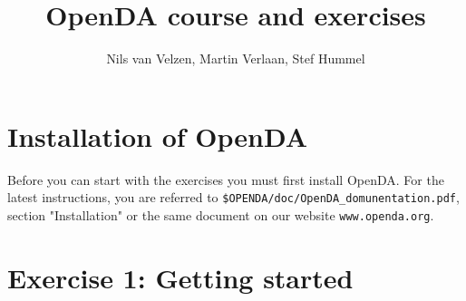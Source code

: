 \documentclass[a4paper,10pt]{article}
\title{OpenDA course and exercises}
\author{Nils van Velzen, Martin Verlaan, Stef Hummel}
\begin{document}

\maketitle



\section*{Installation of OpenDA}
Before you can start with the exercises you must first install OpenDA. For the
latest instructions, you are referred to \verb|$OPENDA/doc/OpenDA_domunentation.pdf|, 
section "Installation" or the same document on our website \verb|www.openda.org|.

\section{Exercise 1: Getting started}

\end{document}
